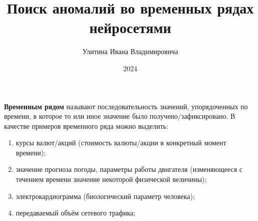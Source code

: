 \documentclass[bachelor, och, referat]{../shiza}
\begin{document}

\title{Поиск аномалий во временных рядах нейросетями}






\author{Улитина Ивана Владимировича}


\date{2024}

\maketitle


\tableofcontents

\intro

    \textbf{Временным рядом} называют последовательность значений, упорядоченных
    по времени, в которое то или иное значение было получено/зафиксировано. В
    качестве примеров временного ряда можно выделить:

    \begin{enumerate}
        \item курсы валют/акций (стоимость валюты/акции в конкретный момент
        времени);
        \item значение прогноза погоды, параметры работы двигателя (изменяющееся
        с течением времени значение некоторой физической величины);
        \item электрокардиограмма (биологический параметр человека);
        \item передаваемый объём сетевого трафика;
    \end{enumerate}
\end{document}
